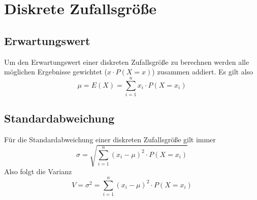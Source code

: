\documentclass{article}
\begin{document}
 
\section{Diskrete Zufallsgröße}
\subsection{Erwartungswert}
Um den Erwartungswert einer diskreten Zufallsgröße zu berechnen werden alle möglichen Ergebnisse gewichtet ($x \cdot P(X=x)$) zusammen addiert. Es gilt also
\[
 \mu = E(X) = \sum_{i=1}^n x_i \cdot P(X=x_i) 
\]
 
\subsection{Standardabweichung}
Für die Standardabweichung einer diskreten Zufallsgröße gilt immer
\[
 \sigma = \sqrt{\sum_{i=1}^n (x_i - \mu)^2 \cdot P(X=x_i)}
\]
Also folgt die Varianz
\[ 
 V = \sigma^2 = \sum_{i=1}^n (x_i - \mu)^2 \cdot P(X=x_i)
\]  
 
\end{document}
